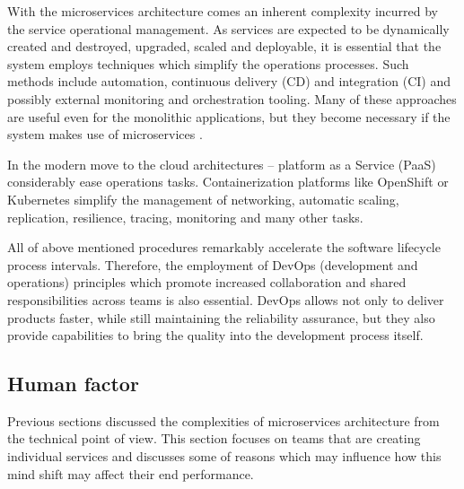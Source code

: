 \documentclass[oneside,
  digital, %
  table,   %
  lof,     %
  lot,     %
]{fithesis3}
\begin{document}
With the microservices architecture comes an inherent complexity incurred by the service operational management. As services are expected to be dynamically created and destroyed, upgraded, scaled and deployable, it is essential that the system employs techniques which simplify the operations processes. Such methods include automation, continuous delivery (CD) and integration (CI) and possibly external monitoring and orchestration tooling. Many of these approaches are useful even for the monolithic applications, but they become necessary if the system makes use of microservices \cite{ms_tradeoffs}.

In the modern move to the cloud architectures -- platform as a Service (PaaS) considerably ease operations tasks. Containerization platforms like OpenShift \cite{openshift} or Kubernetes \cite{kubernetes} simplify the management of networking, automatic scaling, replication, resilience, tracing, monitoring and many other tasks.

All of above mentioned procedures remarkably accelerate the software lifecycle process intervals. Therefore, the employment of DevOps (development and operations) principles which promote increased collaboration and shared responsibilities across teams is also essential. DevOps allows not only to deliver products faster, while still maintaining the reliability assurance, but they also provide capabilities to bring the quality into the development process itself.

\subsection{Human factor}

Previous sections discussed the complexities of microservices architecture from the technical point of view. This section focuses on teams that are creating individual services and discusses some of reasons which may influence how this mind shift may affect their end performance.
\end{document}
